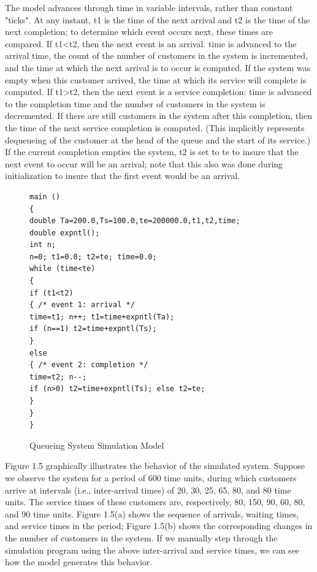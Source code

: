 The model advances through time in variable intervals, rather than constant
"ticks". At any instant, t1 is the time of the next arrival and t2 is the time
of the next completion; to determine which event occurs next, these times are
compared. If t1<t2, then the next event is an arrival. time is advanced to the
arrival time, the count of the number of customers in the system is incremented,
and the time at which the next arrival is to occur is computed. If the system
was empty when this customer arrived, the time at which its service will
complete is computed. If t1>t2, then the next event is a service completion:
time is advanced to the completion time and the number of customers in the
system is decremented. If there are still customers in the system after this
completion, then the time of the next service completion is computed. (This
implicitly represents dequeueing of the customer at the head of the queue and
the start of its service.) If the current completion empties the system, t2 is
set to te to insure that the next event to occur will be an arrival; note that
this also was done during initialization to insure that the first event would
be an arrival.

\begin{figure}[htbp]
  \centering
  \begin{minipage}{0.9\textwidth}
    \begin{verbatim}
main ()
{
double Ta=200.0,Ts=100.0,te=200000.0,t1,t2,time;
double expntl();
int n;
n=0; t1=0.0; t2=te; time=0.0;
while (time<te)
{
if (t1<t2)
{ /* event 1: arrival */
time=t1; n++; t1=time+expntl(Ta);
if (n==1) t2=time+expntl(Ts);
}
else
{ /* event 2: completion */
time=t2; n--;
if (n>0) t2=time+expntl(Ts); else t2=te;
}
}
}
    \end{verbatim}
  \end{minipage}
  \caption{Queueing System Simulation Model}
\end{figure}

Figure 1.5 graphically illustrates the behavior of the simulated system.
Suppose we observe the system for a period of 600 time units, during which
customers arrive at intervals (i.e., inter-arrival times) of 20, 30, 25, 65, 80,
and 80 time units. The service times of these customers are, respectively, 80,
150, 90, 60, 80, and 90 time units. Figure 1.5(a) shows the sequence of
arrivals, waiting times, and service times in the period; Figure 1.5(b) shows
the corresponding changes in the number of customers in the system. If we
manually step through the simulation program using the above inter-arrival and
service times, we can see how the model generates this behavior.

